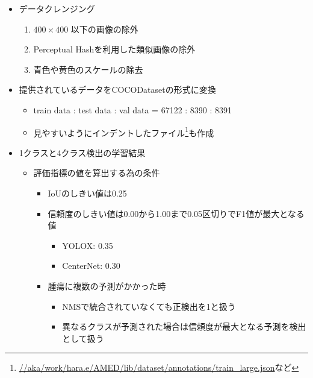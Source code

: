 \documentclass[a4j]{ujarticle}
\begin{document}
        \begin{itemize}
            \item データクレンジング
            \begin{enumerate}
                \item $400 \times 400$ 以下の画像の除外
                \item Perceptual Hashを利用した類似画像の除外
                \item 青色や黄色のスケールの除去
            \end{enumerate}

            \item 提供されているデータをCOCODatasetの形式に変換
            \begin{itemize}
                \item train data : test data : val data = 67122 : 8390 : 8391
                \item 見やすいようにインデントしたファイル\footnote{\url{//aka/work/hara.e/AMED/lib/dataset/annotations/train_large.json}など}も作成
            \end{itemize}

\clearpage

            \item 1クラスと4クラス検出の学習結果
            \begin{itemize}
                \item 評価指標の値を算出する為の条件
                \begin{itemize}
                    \item IoUのしきい値は0.25
                    \item 信頼度のしきい値は0.00から1.00まで0.05区切りでF1値が最大となる値
                    \begin{itemize}
                        \item YOLOX: 0.35
                        \item CenterNet: 0.30
                    \end{itemize}
                    \item 腫瘍に複数の予測がかかった時
                    \begin{itemize}
                        \item NMSで統合されていなくても正検出を1と扱う
                        \item 異なるクラスが予測された場合は信頼度が最大となる予測を検出として扱う
                    \end{itemize}
                \end{itemize}
            \end{itemize}


\end{itemize}
\end{document}
